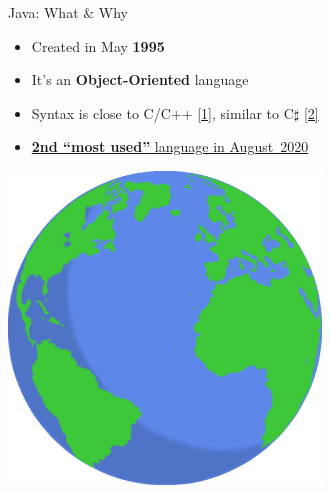 \documentclass[English,c,%
hyperref={%
    pdftitle={FISA-DE2 OOP in Java},%
    pdfauthor={Muller, Gravier, Laforest, Subercaze},%
    pdfsubject={OOP in Java},%
    pdfkeywords={OOP, Java},%
    colorlinks=true,%
    urlcolor=blue,%
    linkcolor=%
    },%
xcolor={pdftex,svgnames} %
]{beamer}
\begin{document}
\begin{frame}{Java: What \& Why}
  \hspace{1cm}
  \begin{itemize}
    \item Created in May \textbf{1995}
    \vspace{1em}
    \item It's an \textbf{Object-Oriented} language %
    \vspace{1em}
    \item Syntax is close to C/C++ \href{https://en.wikipedia.org/wiki/Comparison_of_Java_and_C\%2B\%2B}{[1]}, similar to C$\sharp$ \href{https://en.wikipedia.org/wiki/Comparison_of_C_Sharp_and_Java}{[2]}
    \vspace{1em}
    \item \href{https://www.tiobe.com/tiobe-index/}{\textbf{2nd ``most used''} language in August~2020}
  \end{itemize}

  \begin{center}
    \includegraphics[height=8.3cm]{images01/earth1.png}
  \end{center}

\end{frame}
\end{document}
